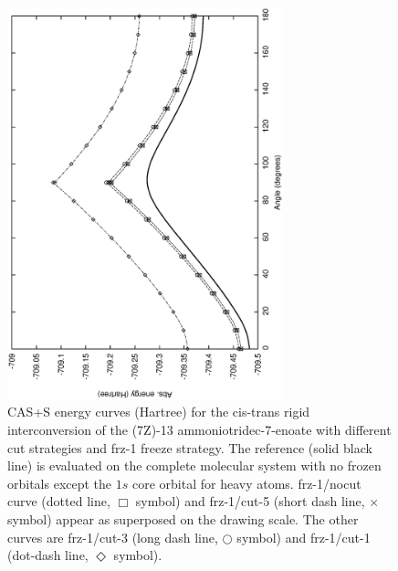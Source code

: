 \begin{figure}[h!]
\begin{center}
\includegraphics[width=8cm,keepaspectratio,angle=270]{02_localization/images/7Z-frz-1.eps}
\caption{\footnotesize CAS+S energy curves (Hartree) for the cis-trans rigid
interconversion of the (7Z)-13 ammoniotridec-7-enoate with different 
cut strategies and frz-1 freeze strategy. The reference (solid black line)
is evaluated on the complete molecular system with no frozen orbitals except
the $1s$ core orbital for heavy atoms. frz-1/nocut curve (dotted line,
$\Box$ symbol) and frz-1/cut-5 (short dash line, $\times$ symbol) appear as
superposed on the drawing scale. The other curves are frz-1/cut-3 (long
dash line, $\bigcirc$ symbol) and frz-1/cut-1 (dot-dash line, $\Diamond$
symbol).  }
\label{fig:7Z-frz-1}
\end{center}
\end{figure}

